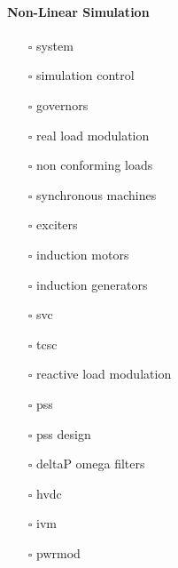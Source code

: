 \documentclass[12pt]{article}
\begin{document}
\begin{multicols}{2}

\paragraph{Non-Linear Simulation}
\begin{itemize}
	\item[$\square$] system 
	\item[$\square$] simulation control
	\item[$\square$] governors
	\item[$\square$] real load modulation 
	\item[$\square$] non conforming loads
	\item[$\square$] synchronous machines	
	\item[$\square$] exciters	 	 
	\item[$\square$] induction motors	 
	\item[$\square$] induction generators	 
	\item[$\square$] svc	 
	\item[$\square$] tcsc	 
	\item[$\square$] reactive load modulation
	\item[$\square$] pss
	\item[$\square$] pss design	  
	\item[$\square$] deltaP omega filters
	\item[$\square$] hvdc
	\item[$\square$] ivm	  
	\item[$\square$] pwrmod
\end{itemize}

\vfill\null
\columnbreak

\end{multicols}
\end{document}
